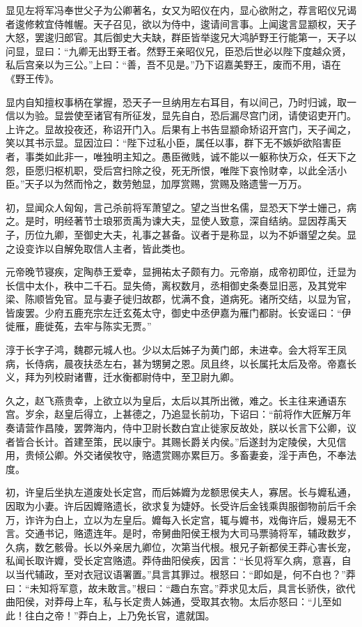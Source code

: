 \documentclass[]{article}
\begin{document}
显见左将军冯奉世父子为公卿著名，女又为昭仪在内，显心欲附之，荐言昭仪兄谒者逡修敕宜侍帷幄。天子召见，欲以为侍中，逡请间言事。上闻逡言显颛权，天子大怒，罢逡归郎官。其后御史大夫缺，群臣皆举逡兄大鸿胪野王行能第一，天子以问显，显曰：``九卿无出野王者。然野王亲昭仪兄，臣恐后世必以陛下度越众贤，私后宫亲以为三公。''上曰：``善，吾不见是。''乃下诏嘉美野王，废而不用，语在《野王传》。

显内自知擅权事柄在掌握，恐天子一旦纳用左右耳目，有以间己，乃时归诚，取一信以为验。显尝使至诸官有所征发，显先自白，恐后漏尽宫门闭，请使诏吏开门。上许之。显故投夜还，称诏开门入。后果有上书告显颛命矫诏开宫门，天子闻之，笑以其书示显。显因泣曰：``陛下过私小臣，属任以事，群下无不嫉妒欲陷害臣者，事类如此非一，唯独明主知之。愚臣微贱，诚不能以一躯称快万众，任天下之怨，臣愿归枢机职，受后宫扫除之役，死无所恨，唯陛下哀怜财幸，以此全活小臣。''天子以为然而怜之，数劳勉显，加厚赏赐，赏赐及赂遗訾一万万。

初，显闻众人匈匈，言己杀前将军萧望之。望之当世名儒，显恐天下学士姗己，病之。是时，明经著节士琅邪贡禹为谏大夫，显使人致意，深自结纳。显因荐禹天子，历位九卿，至御史大夫，礼事之甚备。议者于是称显，以为不妒谮望之矣。显之设变诈以自解免取信人主者，皆此类也。

元帝晚节寝疾，定陶恭王爱幸，显拥祐太子颇有力。元帝崩，成帝初即位，迁显为长信中太仆，秩中二千石。显失倚，离权数月，丞相御史条奏显旧恶，及其党牢梁、陈顺皆免官。显与妻子徙归故郡，忧满不食，道病死。诸所交结，以显为官，皆废罢。少府五鹿充宗左迁玄菟太守，御史中丞伊嘉为雁门都尉。长安谣曰：``伊徙雁，鹿徙菟，去牢与陈实无贾。''

淳于长字子鸿，魏郡元城人也。少以太后姊子为黄门郎，未进幸。会大将军王凤病，长侍病，晨夜扶丞左右，甚为甥舅之恩。凤且终，以长属托太后及帝。帝嘉长义，拜为列校尉诸曹，迁水衡都尉侍中，至卫尉九卿。

久之，赵飞燕贵幸，上欲立以为皇后，太后以其所出微，难之。长主往来通语东宫。岁余，赵皇后得立，上甚德之，乃追显长前功，下诏曰：``前将作大匠解万年奏请营作昌陵，罢弊海内，侍中卫尉长数白宜止徙家反故处，朕以长言下公卿，议者皆合长计。首建至策，民以康宁。其赐长爵关内侯。''后遂封为定陵侯，大见信用，贵倾公卿。外交诸侯牧守，赂遗赏赐亦累巨万。多畜妻妾，淫于声色，不奉法度。

初，许皇后坐执左道废处长定宫，而后姊孊为龙额思侯夫人，寡居。长与孊私通，因取为小妻。许后因孊赂遗长，欲求复为婕妤。长受许后金钱乘舆服御物前后千余万，诈许为白上，立以为左皇后。孊每入长定宫，辄与孊书，戏侮许后，嫚易无不言。交通书记，赂遗连年。是时，帝舅曲阳侯王根为大司马票骑将军，辅政数岁，久病，数乞骸骨。长以外亲居九卿位，次第当代根。根兄子新都侯王莽心害长宠，私闻长取许孊，受长定宫赂遗。莽侍曲阳侯疾，因言：``长见将军久病，意喜，自以当代辅政，至对衣冠议语署置。''具言其罪过。根怒曰：``即如是，何不白也？''莽曰：``未知将军意，故未敢言。''根曰：``趣白东宫。''莽求见太后，具言长骄佚，欲代曲阳侯，对莽母上车，私与长定贵人姊通，受取其衣物。太后亦怒曰：``儿至如此！往白之帝！''莽白上，上乃免长官，遣就国。
\end{document}
